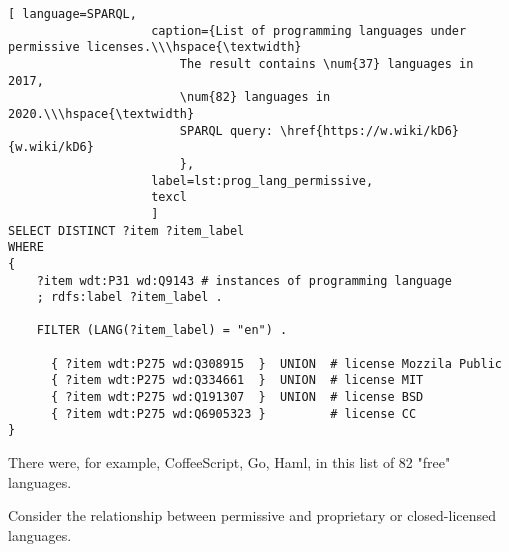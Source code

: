\begin{lstlisting}[ language=SPARQL, 
                    caption={List of programming languages under permissive licenses.\\\hspace{\textwidth}
                        The result contains \num{37} languages in 2017, 
                        \num{82} languages in 2020.\\\hspace{\textwidth}
                        SPARQL query: \href{https://w.wiki/kD6}{w.wiki/kD6}
                        },
                    label=lst:prog_lang_permissive,
                    texcl 
                    ]
SELECT DISTINCT ?item ?item_label
WHERE
{
    ?item wdt:P31 wd:Q9143 # instances of programming language
    ; rdfs:label ?item_label . 

    FILTER (LANG(?item_label) = "en") . 
  
      { ?item wdt:P275 wd:Q308915  }  UNION  # license Mozzila Public
      { ?item wdt:P275 wd:Q334661  }  UNION  # license MIT
      { ?item wdt:P275 wd:Q191307  }  UNION  # license BSD
      { ?item wdt:P275 wd:Q6905323 }         # license CC
}
\end{lstlisting}%

There were, for example, CoffeeScript, Go, Haml, in this list of 82 "free" languages.

Consider the relationship between permissive and proprietary or closed-licensed languages.

